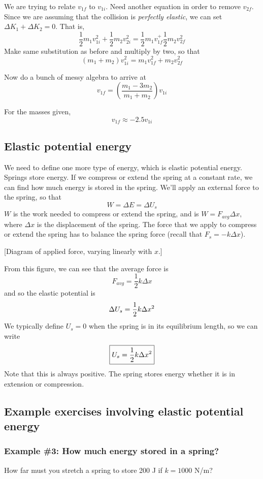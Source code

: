 We are trying to relate $v_{1f}$ to $v_{1i}$. Need another equation in order to remove $v_{2f}$. Since we are assuming that the collision is \textit{perfectly elastic}, we can set $\Delta K_1+\Delta K_2 = 0$.
That is,
$$\frac{1}{2}m_1v_{1i}^2+\frac{1}{2}m_2v_{2i}^2=\frac{1}{2}m_1v_{1f}^+\frac{1}{2}m_2v_{2f}^2$$
Make same substitution as before and multiply by two, so that
$$\boxed{(m_1+m_2)v_{1i}^2 = m_1v_{1f}^2+m_2v_{2f}^2}$$

Now do a bunch of messy algebra to arrive at
$$\boxed{v_{1f}=\left(\frac{m_1-3m_2}{m_1+m_2}\right)v_{1i}}$$

For the masses given,
$$v_{1f}\approx -2.5v_{1i}$$ 

\subsection{Elastic potential energy}
We need to define one more type of energy, which is elastic potential energy. Springs store energy. If we compress or extend the spring at a constant rate, we can find how much energy is stored in the spring. We'll apply an external force to the spring, so that
$$W=\Delta{E}=\Delta{U_s}$$
$W$ is the work needed to compress or extend the spring, and is
$W=F_{avg}\Delta{x},$
where $\Delta{x}$ is the displacement of the spring. The force that we apply to compress or extend the spring has to balance the spring force (recall that $F_s=-k\Delta{x}$).

[Diagram of applied force, varying linearly with $x$.]
\vspace{5cm}


From this figure, we can see that the average force is
$$F_{avg}=\frac{1}{2}k\Delta{x}$$
and so the elastic potential is
$$\Delta{U_s}=\frac{1}{2}k\Delta{x}\displaystyle^2$$
We typically define $U_s=0$ when the spring is in its equilibrium length, so we can write
$$\boxed{U_s=\frac{1}{2}k\Delta{x}\displaystyle^2}$$
Note that this is always positive. The spring stores energy whether it is in extension or compression.

\subsection{Example exercises involving elastic potential energy}
\subsubsection*{Example \#3: How much energy stored in a spring?}
How far must you stretch a spring to store 200 J if $k=1000$ N/m?

